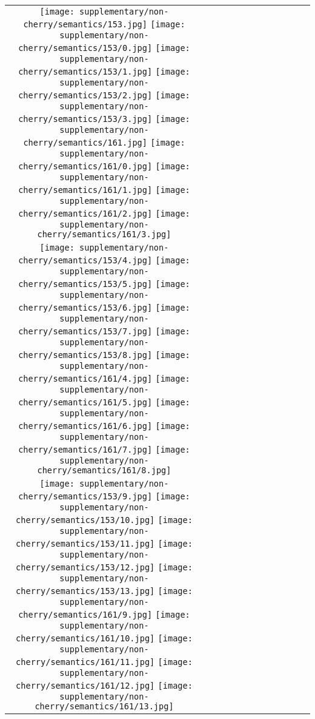 \begin{figure*}[tb!]
    \centering
    \setlength{\tabcolsep}{0.5pt}
    {\small
    \renewcommand{\arraystretch}{0.5} 
    \begin{tabular}{c c c c c c c c c c c c }
    \captionsetup{type=figure, font=scriptsize}
  \texttt{[image: supplementary/non-cherry/semantics/153.jpg]}
  \texttt{[image: supplementary/non-cherry/semantics/153/0.jpg]}
  \texttt{[image: supplementary/non-cherry/semantics/153/1.jpg]}
  \texttt{[image: supplementary/non-cherry/semantics/153/2.jpg]}
  \texttt{[image: supplementary/non-cherry/semantics/153/3.jpg]}
    \hspace{5mm}
      \texttt{[image: supplementary/non-cherry/semantics/161.jpg]}
  \texttt{[image: supplementary/non-cherry/semantics/161/0.jpg]}
  \texttt{[image: supplementary/non-cherry/semantics/161/1.jpg]}
  \texttt{[image: supplementary/non-cherry/semantics/161/2.jpg]}
  \texttt{[image: supplementary/non-cherry/semantics/161/3.jpg]}

 \tabularnewline
  \texttt{[image: supplementary/non-cherry/semantics/153/4.jpg]}
  \texttt{[image: supplementary/non-cherry/semantics/153/5.jpg]}
  \texttt{[image: supplementary/non-cherry/semantics/153/6.jpg]}
  \texttt{[image: supplementary/non-cherry/semantics/153/7.jpg]}
  \texttt{[image: supplementary/non-cherry/semantics/153/8.jpg]}
    \hspace{5mm}
  \texttt{[image: supplementary/non-cherry/semantics/161/4.jpg]}
  \texttt{[image: supplementary/non-cherry/semantics/161/5.jpg]}
  \texttt{[image: supplementary/non-cherry/semantics/161/6.jpg]}
  \texttt{[image: supplementary/non-cherry/semantics/161/7.jpg]}
  \texttt{[image: supplementary/non-cherry/semantics/161/8.jpg]}
\tabularnewline
  \texttt{[image: supplementary/non-cherry/semantics/153/9.jpg]}
  \texttt{[image: supplementary/non-cherry/semantics/153/10.jpg]}
  \texttt{[image: supplementary/non-cherry/semantics/153/11.jpg]}
  \texttt{[image: supplementary/non-cherry/semantics/153/12.jpg]}
  \texttt{[image: supplementary/non-cherry/semantics/153/13.jpg]}
    \hspace{5mm}
  \texttt{[image: supplementary/non-cherry/semantics/161/9.jpg]}
  \texttt{[image: supplementary/non-cherry/semantics/161/10.jpg]}
  \texttt{[image: supplementary/non-cherry/semantics/161/11.jpg]}
  \texttt{[image: supplementary/non-cherry/semantics/161/12.jpg]}
  \texttt{[image: supplementary/non-cherry/semantics/161/13.jpg]}


\end{tabular}}
\end{figure*}
